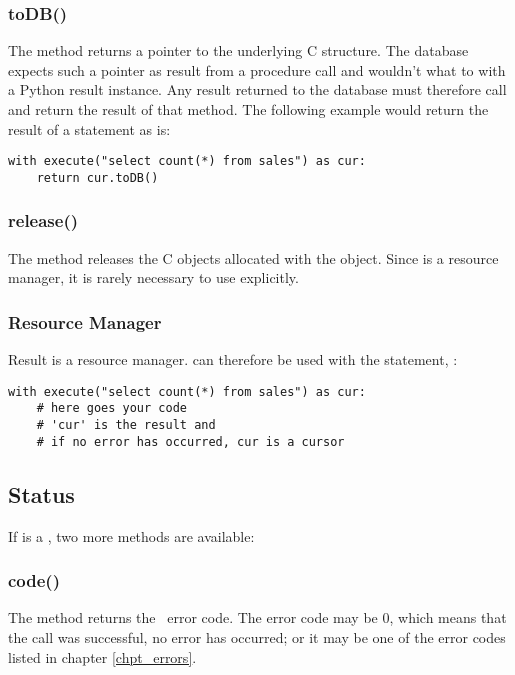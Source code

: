 \subsubsection{toDB()}
The method returns a  pointer
to the underlying C structure.
The database expects such a pointer
as result from a procedure call and
wouldn't what to with a Python result instance.
Any result returned to the database
must therefore call  
and return the result of that method.
The following example would return
the result of a statement as is:

\begin{python}
\begin{lstlisting}
with execute("select count(*) from sales") as cur:
    return cur.toDB()
\end{lstlisting}
\end{python}

\subsubsection{release()}
The method releases the C objects
allocated with the  object.
Since  is a resource manager,
it is rarely necessary to use explicitly.

\subsubsection{Resource Manager}
Result is a resource manager.
 can therefore
be used with the  statement, \eg:

\begin{python}
\begin{lstlisting}
with execute("select count(*) from sales") as cur:
    # here goes your code
    # 'cur' is the result and
    # if no error has occurred, cur is a cursor
\end{lstlisting}
\end{python}

\subsection{Status}
If  is a ,
two more methods are available:

\subsubsection{code()}
The method returns the \nowdb\ error code.
The error code may be 0,
which means that the call was successful,
no error has occurred;
or it may be one of the error codes listed in
chapter \ref{chpt_errors}.

